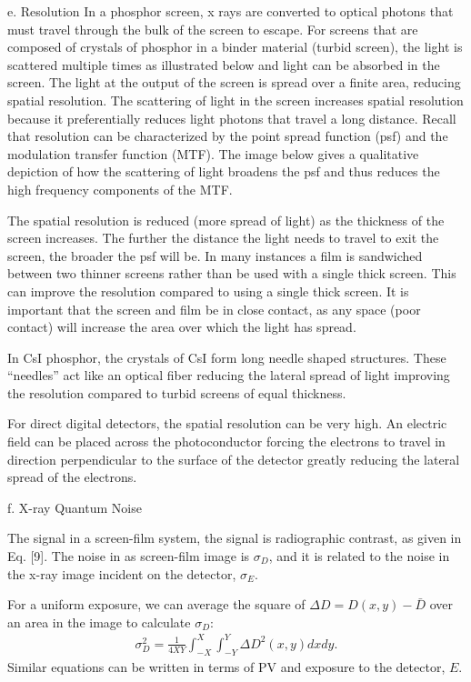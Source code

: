 \documentclass[mphy386-notes.tex]{subfiles}
\begin{document}
e. Resolution In a phosphor screen, x rays are converted to optical photons that
must travel through the bulk of the screen to escape. For screens that are
composed of crystals of phosphor in a binder material (turbid screen), the light
is scattered multiple times as illustrated below and light can be absorbed in
the screen. The light at the output of the screen is spread over a finite area,
reducing spatial resolution. The scattering of light in the screen increases
spatial resolution because it preferentially reduces light photons that travel a
long distance. Recall that resolution can be characterized by the point spread
function (psf) and the modulation transfer function (MTF). The image below
gives a qualitative depiction of how the scattering of light broadens the psf
and thus reduces the high frequency components of the MTF.

The spatial resolution is reduced (more spread of light) as the thickness of the
screen increases. The further the distance the light needs to travel to exit
the screen, the broader the psf will be. In many instances a film is sandwiched
between two thinner screens rather than be used with a single thick screen.
This can improve the resolution compared to using a single thick screen. It is
important that the screen and film be in close contact, as any space (poor
contact) will increase the area over which the light has spread.

In CsI phosphor, the crystals of CsI form long needle shaped structures. These
“needles” act like an optical fiber reducing the lateral spread of light
improving the resolution compared to turbid screens of equal thickness.

For direct digital detectors, the spatial resolution can be very high. An
electric field can be placed across the photoconductor forcing the electrons to
travel in direction perpendicular to the surface of the detector greatly
reducing the lateral spread of the electrons.

f. X-ray Quantum Noise

The signal in a screen-film system, the signal is radiographic contrast, as
given in Eq. [9]. The noise in as screen-film image is $\sigma_D$, and it is
related to the noise in the x-ray image incident on the detector, $\sigma_E$.

For a uniform exposure, we can average the square of $\Delta D = D(x,y) - \bar{D}$
over an area in the image to calculate $\sigma_D$:
\begin{align}
  \sigma_D^2 = \frac{1}{4XY}\int_{-X}^{X}\int_{-Y}^{Y}\Delta D^2(x,y)dxdy.
\end{align}
Similar equations can be written in terms of PV and exposure to the detector, $E$. 
\end{document}
